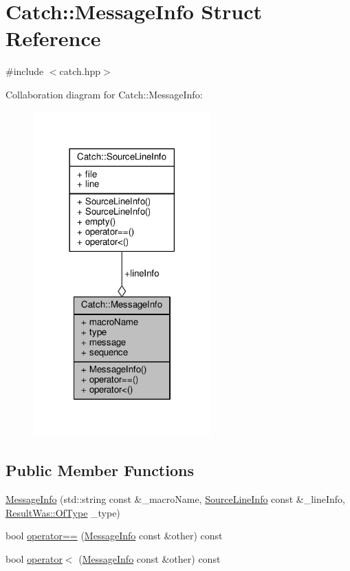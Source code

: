 \hypertarget{struct_catch_1_1_message_info}{\section{Catch\-:\-:Message\-Info Struct Reference}
\label{struct_catch_1_1_message_info}
}


{\ttfamily \#include $<$catch.\-hpp$>$}



Collaboration diagram for Catch\-:\-:Message\-Info\-:
\nopagebreak
\begin{figure}[H]
\begin{center}
\leavevmode
\includegraphics[width=194pt]{struct_catch_1_1_message_info__coll__graph}
\end{center}
\end{figure}
\subsection*{Public Member Functions}
\begin{DoxyCompactItemize}
\item 
\hyperlink{struct_catch_1_1_message_info_a2e336c33ebef7af3c1bbae6a56e14f8a}{Message\-Info} (std\-::string const \&\-\_\-macro\-Name, \hyperlink{struct_catch_1_1_source_line_info}{Source\-Line\-Info} const \&\-\_\-line\-Info, \hyperlink{struct_catch_1_1_result_was_a624e1ee3661fcf6094ceef1f654601ef}{Result\-Was\-::\-Of\-Type} \-\_\-type)
\item 
bool \hyperlink{struct_catch_1_1_message_info_a30fe117138e568c5a9dfdabb7de6e790}{operator==} (\hyperlink{struct_catch_1_1_message_info}{Message\-Info} const \&other) const 
\item 
bool \hyperlink{struct_catch_1_1_message_info_a7a2b1ec3772cd35176e2ee25a94be16a}{operator$<$} (\hyperlink{struct_catch_1_1_message_info}{Message\-Info} const \&other) const 
\end{DoxyCompactItemize}
